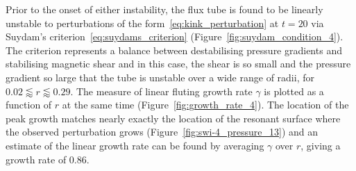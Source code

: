 \documentclass[fleqn,usenatbib]{mnras}
\begin{document}
Prior to the onset of either instability, the flux tube is found to be linearly
unstable to perturbations of the form~\eqref{eq:kink_perturbation} at $t=20$
via Suydam's criterion~\eqref{eq:suydams_criterion}
(Figure~\ref{fig:suydam_condition_4}). The criterion represents a balance
between destabilising pressure gradients and stabilising magnetic shear and in
this case, the shear is so small and the pressure gradient so large that the
tube is unstable over a wide range of radii, for $ 0.02 \lessapprox
r \lessapprox 0.29$. The measure of linear fluting growth rate $\gamma$ is
plotted as a function of $r$ at the same time (Figure~\ref{fig:growth_rate_4}).
The location of the peak growth matches nearly exactly the location of the
resonant surface where the observed perturbation grows
(Figure~\ref{fig:swi-4_pressure_13}) and an estimate of the linear growth rate
can be found by averaging $\gamma$ over $r$, giving a growth rate of $0.86$.
\end{document}
